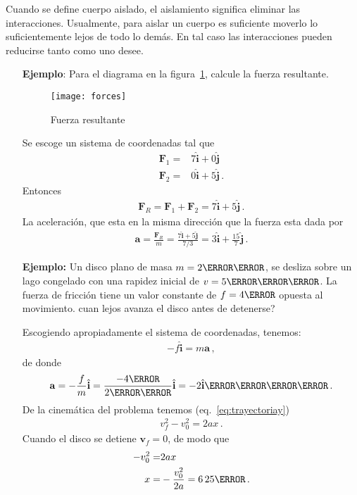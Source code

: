 \begin{borrar}
Cuando se define cuerpo aislado, el aislamiento significa eliminar las interacciones. Usualmente, para aislar un cuerpo es suficiente moverlo lo suficientemente lejos de todo lo dem\'as. En tal caso las interacciones pueden reducirse tanto como uno desee.
  
\end{borrar}


\begin{itemize}
\item[\textbf{Ejemplo}:] Para el diagrama en la figura~\ref{fig:forces}, calcule la fuerza resultante.
  \begin{figure}
    \centering
    \texttt{[image: forces]}
    \caption{Fuerza resultante}
    \label{fig:forces}
  \end{figure}

Se escoge un sistema de coordenadas tal que
\begin{align}
  \mathbf{F}_1=&7\hat{\mathbf{i}}+0\hat{\mathbf{j}}\nonumber\\
  \mathbf{F}_2=&0\hat{\mathbf{i}}+5\hat{\mathbf{j}}\,.
\end{align}
Entonces
\begin{align}
  \mathbf{F}_R=\mathbf{F}_1+\mathbf{F}_2=
  7\hat{\mathbf{i}}+5\hat{\mathbf{j}}\,.
\end{align}
La aceleraci\'on, que esta en la misma direcci\'on que la fuerza esta dada por
\begin{align}
  \mathbf{a}=\frac{\mathbf{F}_R}{m}=\frac{7\hat{\mathbf{i}}+5\hat{\mathbf{j}}}{7/3}=3\hat{\mathbf{i}}+\frac{15}{7}\hat{\mathbf{j}}\,.
\end{align}

\item[\textbf{Ejemplo:}] Un disco plano de masa $m=2\kilo\gram$, se desliza sobre un lago congelado con una rapidez inicial de $v=5\meter\per\second$. La fuerza de fricci\'on tiene un valor constante de $f=4\newton$ opuesta al movimiento. \textquestiondown cuan lejos avanza el disco antes de detenerse?

Escogiendo apropiadamente el sistema de coordenadas, tenemos:
\begin{align}
  -f \hat{\mathbf{i}}=m\mathbf{a}\,,
\end{align}
de donde
\begin{align}
  \mathbf{a}=-\frac{f}{m}\hat{\mathbf{i}}=\frac{-4\newton}{2\kilo\gram}\hat{\mathbf{i}}=\unit{-2\hat{\mathbf{i}}}{\meter\per\second\squared}\,.
\end{align}
De la cinemática del problema tenemos (eq.~\eqref{eq:trayectoriay})
\begin{align}
  v_f^2-v_0^2=2 a x\,.
\end{align}
Cuando el disco se detiene $\mathbf{v}_f=0$, de modo que
\begin{align}
  -v_0^2=&2ax\nonumber\\
  x=&-\frac{v_0^2}{2a}=\unit{6.25}{\meter}\,.
\end{align}


\end{itemize}


